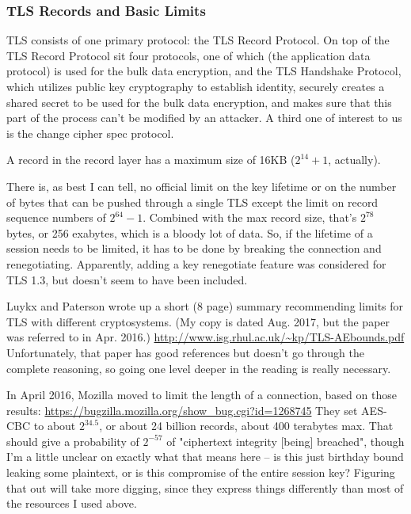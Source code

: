 \subsubsection{TLS Records and Basic Limits}

TLS consists of one primary protocol: the TLS Record Protocol.  On top
of the TLS Record Protocol sit four protocols, one of which (the
application data protocol) is used for the bulk data encryption, and
the TLS Handshake Protocol, which utilizes public key cryptography to
establish identity, securely creates a shared secret to be used for
the bulk data encryption, and makes sure that this part of the process
can't be modified by an attacker.  A third one of interest to us is
the change cipher spec protocol.

A record in the record layer has a maximum size of 16KB ($2^{14}+1$, actually).

There is, as best I can tell, no official limit on the key lifetime or
on the number of bytes that can be pushed through a single TLS except
the limit on record sequence numbers of $2^{64}-1$.  Combined with the
max record size, that's $2^{78}$ bytes, or 256 exabytes, which is a bloody
lot of data.  So, if the lifetime of a session needs to be limited, it
has to be done by breaking the connection and renegotiating.
Apparently, adding a key renegotiate feature was considered for
TLS 1.3, but doesn't seem to have been included.

Luykx and Paterson wrote up a short (8 page) summary recommending
limits for TLS with different cryptosystems. (My copy is dated
Aug. 2017, but the paper was referred to in Apr. 2016.)
\url{http://www.isg.rhul.ac.uk/~kp/TLS-AEbounds.pdf}
Unfortunately, that paper has good references but doesn't go through
the complete reasoning, so going one level deeper in the reading is
really necessary.

In April 2016, Mozilla moved to limit the length of a connection,
based on those results:
\url{https://bugzilla.mozilla.org/show_bug.cgi?id=1268745}
They set AES-CBC to about $2^{34.5}$, or about 24 billion records, about
400 terabytes max.  That should give a probability of $2^{-57}$ of
"ciphertext integrity [being] breached", though I'm a little unclear
on exactly what that means here -- is this just birthday bound leaking
some plaintext, or is this compromise of the entire session key?
Figuring that out will take more digging, since they express things
differently than most of the resources I used above.

